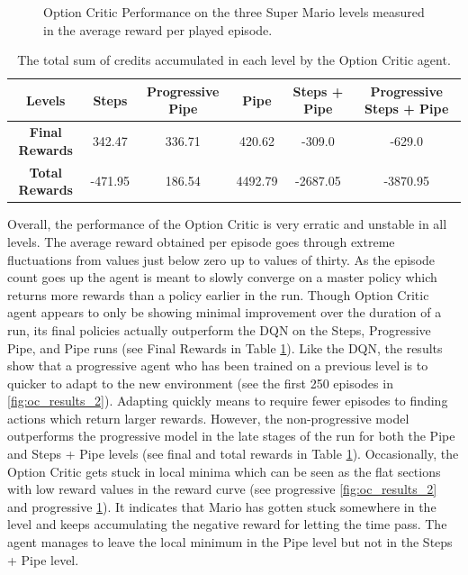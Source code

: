 \documentclass[notitlepage,a4paper,11pt]{article}
\begin{document}
\begin{figure}[htb!]
\begin{subfigure}[t]{0.32\textwidth}
         \caption{}
         \label{fig:oc_results_3}
     \end{subfigure}
        \caption{Option Critic Performance on the three Super Mario levels measured in the average reward per played episode.}
        \label{fig:oc_results}
\end{figure}

\begin{table}[htb!]
\centering
\begin{tabular}{ |c|c|c|c|c|c| } 
	\hline
	\textbf{Levels} & Steps & Progressive Pipe  & Pipe & Steps + Pipe & Progressive Steps + Pipe \\
	\hline
	\textbf{Final Rewards} & 342.47 & 336.71 & 420.62 & -309.0 & -629.0\\
	\hline
	\textbf{Total Rewards} & -471.95 & 186.54 & 4492.79 &  -2687.05 & -3870.95 \\
	\hline
\end{tabular}
\caption{The total sum of credits accumulated in each level by the Option Critic agent.}
\label{tbl:oc_rewards}
\end{table}

Overall, the performance of the Option Critic is very erratic and unstable in all levels. The average reward obtained per episode goes through extreme fluctuations from values just below zero up to values of thirty. As the episode count goes up the agent is meant to slowly converge on a master policy which returns more rewards than a policy earlier in the run. Though Option Critic agent appears to only be showing minimal improvement over the duration of a run, its final policies actually outperform the DQN on the Steps, Progressive Pipe, and Pipe runs (see Final Rewards in Table \ref{tbl:oc_rewards}). Like the DQN, the results show that a progressive agent who has been trained on a previous level is to quicker to adapt to the new environment (see the first 250 episodes in \ref{fig:oc_results_2}). Adapting quickly means to require fewer episodes to finding actions which return larger rewards. However, the non-progressive model outperforms the progressive model in the late stages of the run for both the Pipe and Steps + Pipe levels (see final and total rewards in Table \ref{tbl:oc_rewards}). Occasionally, the Option Critic gets stuck in local minima which can be seen as the flat sections with low reward values in the reward curve (see progressive \ref{fig:oc_results_2} and progressive \ref{fig:oc_results_3}). It indicates that Mario has gotten stuck somewhere in the level and keeps accumulating the negative reward for letting the time pass. The agent manages to leave the local minimum in the Pipe level but not in the Steps + Pipe level.
\end{document}
